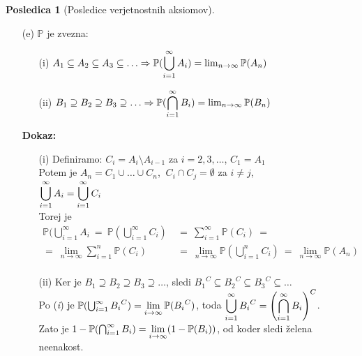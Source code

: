 \documentclass[11pt]{article}
\theoremstyle{definition}
\theoremstyle{definition}
\theoremstyle{definition}
\newtheorem*{posledica}{Posledica}
\begin{document}
\begin{posledica}[Posledice verjetnostnih aksiomov]
\begin{enumerate}
\item[(e)] $\mathbb{P}$ je zvezna:
\begin{enumerate}
	\item[(i)] $A_1 \subseteq A_2 \subseteq A_3 \subseteq \ldots \Rightarrow \mathbb{P}(\mathlarger{\bigcup_{i=1}^{\infty} A_i}) = \lim_{n \rightarrow \infty} \mathbb{P}(A_n)$
	\item[(ii)] $B_1 \supseteq B_2 \supseteq B_3 \supseteq \ldots \Rightarrow \mathbb{P}(\mathlarger{\bigcap_{i=1}^{\infty} B_i}) = \lim_{n \rightarrow \infty} \mathbb{P}(B_n)$
\end{enumerate} 
\textbf{Dokaz:}
\begin{enumerate}
	\item[(i)] Definiramo: $C_i = A_i \setminus A_{i-1}$ za $i = 2, 3, \ldots$, $C_1 = A_1$ \\
	Potem je $A_n = C_1 \cup \ldots \cup C_n$, $~C_i \cap C_j = \emptyset$ za $i \neq j$, \\ 
	$\mathlarger{\bigcup_{i=1}^{\infty} A_i} = \mathlarger{\bigcup_{i=1}^{\infty} C_i}$ \\
	Torej je 
	\begin{align*}
	\mathbb{P}(\bigcup_{i=1}^{\infty} A_i ~=~ \mathbb{P}(\bigcup_{i=1}^{\infty} C_i) ~&=~ \sum_{i=1}^{\infty} \mathbb{P}(C_i) ~= \\
	=~ \lim_{n \rightarrow \infty} \sum_{i=1}^{n} \mathbb{P}(C_i) ~&=~ \lim_{n \rightarrow \infty} \mathbb{P}(\bigcup_{i=1}^{n} C_i) ~=~ \lim_{n \rightarrow \infty} \mathbb{P}(A_n) \\
	\end{align*}
	\item[(ii)] Ker je $B_1 \supseteq B_2 \supseteq B_3 \supseteq \ldots$, sledi ${B_1}^C \subseteq {B_2}^C \subseteq {B_3}^C \subseteq \ldots$ \\
	Po (\textit{i}) je $\mathbb{P}(\bigcup_{i=1}^{\infty} {B_i}^C) = \mathlarger{\lim_{i \rightarrow \infty} \mathbb{P}({B_i}^C)}$, toda $\mathlarger{\bigcup_{i=1}^{\infty} {B_i}^C = \left( \bigcap_{i=1}^{\infty} B_i \right)^C}$. \\
	Zato je $1 - \mathbb{P}(\bigcap_{i=1}^{\infty} B_i) = \mathlarger{\lim_{i \rightarrow \infty}} (1 - \mathbb{P}(B_i))$, od koder sledi želena neenakost.
\end{enumerate}
\end{enumerate}
\end{posledica}
\vspace{0.5cm}

\end{document}

